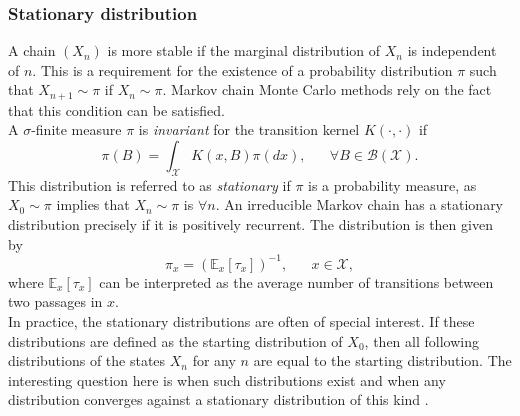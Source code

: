 \subsubsection{Stationary distribution} \label{sssec:stationary}
A chain $\left(X_n\right)$ is more stable if the marginal distribution of $X_n$ is independent of $n$. This is a requirement for the existence of a probability distribution $\pi$ such that $X_{n+1}\sim\pi$ if $X_n\sim\pi$. Markov chain Monte Carlo methods rely on the fact that this condition can be satisfied. \\
A $\sigma$-finite measure $\pi$ is \textit{invariant} for the transition kernel $K\left(\cdot,\cdot\right)$ if \begin{equation*}
    \pi\left(B\right)=\int_\mathcal{X}K\left(x,B\right)\pi(dx), \hspace{20pt} \forall B\in\mathcal{B}\left(\mathcal{X}\right).
\end{equation*}
This distribution is referred to as \textit{stationary} if $\pi$ is a probability measure, as $X_0\sim\pi$ implies that $X_n\sim\pi$ is $\forall n$. An irreducible Markov chain has a stationary distribution precisely if it is positively recurrent. The distribution is then given by
\begin{equation}
    \pi_x=\left(\mathbb{E}_x\left[\tau_x\right]\right)^{-1}, \hspace{20pt} x\in\mathcal{X},
\end{equation}
where $\mathbb{E}_x\left[\tau_x\right]$ can be interpreted as the average number of transitions between two passages in $x$. \\
In practice, the stationary distributions are often of special interest. If these distributions are defined as the starting distribution of $X_0$, then all following distributions of the states $X_n$ for any $n$ are equal to the starting distribution. The interesting question here is when such distributions exist and when any distribution converges against a stationary distribution of this kind \autocite[][223--224]{robert2013monte}.
